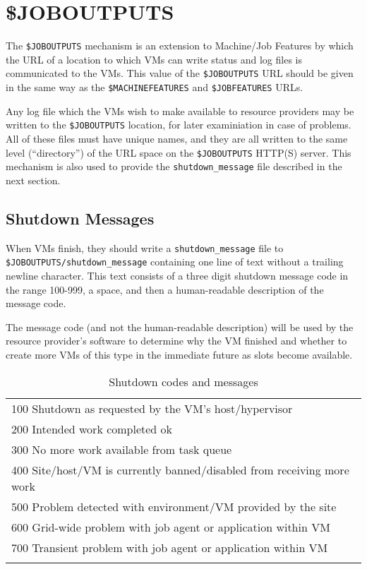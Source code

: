 \documentclass[12pt,a4paper]{article}
\begin{document}
\section{\$JOBOUTPUTS}
\label{sec:joboutputs}

The \texttt{\$JOBOUTPUTS} mechanism is an extension to Machine/Job Features by
which the URL of a location to which VMs can write status and log files
is communicated to the VMs. This value of the \texttt{\$JOBOUTPUTS} URL should
be given in the same way as the \texttt{\$MACHINEFEATURES} and 
\texttt{\$JOBFEATURES} URLs. 

Any log file which the VMs wish to make available to resource providers
may be written to the \texttt{\$JOBOUTPUTS} location, for later examiniation
in case of problems. All of these files must have unique names, and
they are all written to the same level (``directory'') of the URL
space on the \texttt{\$JOBOUTPUTS} HTTP(S) server. This mechanism is also used 
to provide the \texttt{shutdown\_message} file described in the next section.

\subsection{Shutdown Messages}
\label{sec:shutdownmessages}

When VMs finish, they should write a \texttt{shutdown\_message} file to
\texttt{\$JOBOUTPUTS/shutdown\_message} containing one line of text without
a trailing newline character. This text consists of a
three digit shutdown message code in the range 100-999, a space, 
and then a human-readable description of the message code. 

The message code (and not the human-readable description) will
be used by the resource provider's software to determine why
the VM finished and whether to create more VMs of this type in
the immediate future as slots become available.

\begin{center}
\begin{table}[h]
\label{table:shutdowncodes}
\begin{center}
\begin{tabular}{l}
\\
100 Shutdown as requested by the VM's host/hypervisor \\
200 Intended work completed ok \\
300 No more work available from task queue \\
400 Site/host/VM is currently banned/disabled from receiving more work \\
500 Problem detected with environment/VM provided by the site \\
600 Grid-wide problem with job agent or application within VM \\
700 Transient problem with job agent or application within VM \\
\\
\end{tabular}
\caption{\label{opt}Shutdown codes and messages}
\end{center}
\end{table}
\end{center}
\end{document}
